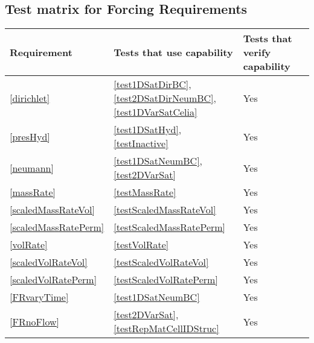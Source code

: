 \subsection{Test matrix for Forcing Requirements}
\begin{tabular}{|l|l|l|l|}
	\hline
	Requirement & Tests that use capability & Tests that verify capability \\
	\hline
	\hline
		\ref{dirichlet} & \ref{test1DSatDirBC}, \ref{test2DSatDirNeumBC}, \ref{test1DVarSatCelia} & Yes\\
	\hline
		\ref{presHyd} & \ref{test1DSatHyd}, \ref{testInactive} & Yes \\
	\hline
		\ref{neumann} & \ref{test1DSatNeumBC}, \ref{test2DVarSat} & Yes\\
	\hline
		\ref{massRate} & \ref{testMassRate} & Yes\\
	\hline
		\ref{scaledMassRateVol} & \ref{testScaledMassRateVol}& Yes \\
	\hline
		\ref{scaledMassRatePerm} & \ref{testScaledMassRatePerm} & Yes\\
	\hline
		\ref{volRate} & \ref{testVolRate} & Yes \\
	\hline
		\ref{scaledVolRateVol} & \ref{testScaledVolRateVol} & Yes\\
	\hline
		\ref{scaledVolRatePerm} & \ref{testScaledVolRatePerm} & Yes\\
	\hline
		\ref{FRvaryTime} & \ref{test1DSatNeumBC} & Yes \\
	\hline
	\ref{FRnoFlow} & \ref{test2DVarSat}, \ref{testRepMatCellIDStruc} & Yes \\
	\hline
\end{tabular}

